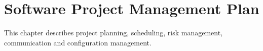 \chapter{Software Project Management Plan}

This chapter describes project planning, scheduling,
risk management, communication and configuration management.












